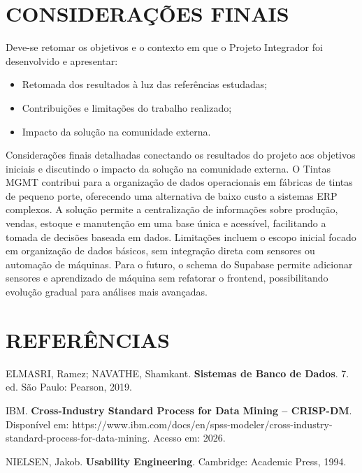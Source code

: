 \documentclass[12pt,a4paper]{article}
\begin{document}
\clearpage
\section{CONSIDERAÇÕES FINAIS}

Deve-se retomar os objetivos e o contexto em que o Projeto Integrador foi desenvolvido e apresentar:

\begin{itemize}
\item Retomada dos resultados à luz das referências estudadas;
\item Contribuições e limitações do trabalho realizado;
\item Impacto da solução na comunidade externa.
\end{itemize}

Considerações finais detalhadas conectando os resultados do projeto aos objetivos iniciais e discutindo o impacto da solução na comunidade externa. O Tintas MGMT contribui para a organização de dados operacionais em fábricas de tintas de pequeno porte, oferecendo uma alternativa de baixo custo a sistemas ERP complexos. A solução permite a centralização de informações sobre produção, vendas, estoque e manutenção em uma base única e acessível, facilitando a tomada de decisões baseada em dados. Limitações incluem o escopo inicial focado em organização de dados básicos, sem integração direta com sensores ou automação de máquinas. Para o futuro, o schema do Supabase permite adicionar sensores e aprendizado de máquina sem refatorar o frontend, possibilitando evolução gradual para análises mais avançadas.

\clearpage
\section{REFERÊNCIAS}
\vspace{2cm}
\linespread{1}\selectfont\setlength{\baselineskip}{12pt}

ELMASRI, Ramez; NAVATHE, Shamkant. 
{\bfseries Sistemas de Banco de Dados}.
7. ed. São Paulo: Pearson, 2019. 

\bigskip

IBM. 
{\bfseries Cross-Industry Standard Process for Data Mining – CRISP-DM}. 
Disponível em: https://www.ibm.com/docs/en/spss-modeler/cross-industry-standard-process-for-data-mining. Acesso em: 2026. 

\bigskip

NIELSEN, Jakob. 
{\bfseries Usability Engineering}. 
Cambridge: Academic Press, 1994. 
\end{document}
